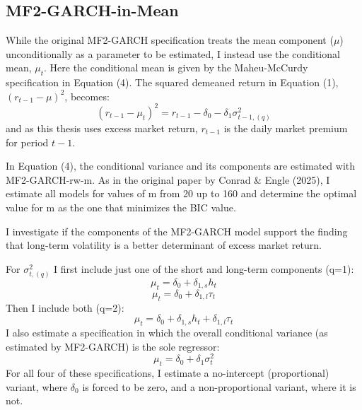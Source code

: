 \documentclass[12pt]{article}
\begin{document}
\subsection{MF2-GARCH-in-Mean}
While the original MF2-GARCH specification treats the mean component ($\mu$) unconditionally as a parameter to be estimated, I instead use the conditional mean, $\mu_t$. Here the conditional mean is given by the Maheu-McCurdy specification in Equation (4). The squared demeaned return in Equation (1), $(r_{t-1}-\mu)^2$, becomes:
\begin{equation}
\nonumber
(r_{t-1}-\mu_t)^2=r_{t-1}-\delta_0-\delta_1\sigma_{t-1,(q)}^2
\end{equation}
and as this thesis uses excess market return, $r_{t-1}$ is the daily market premium for period $t-1$.\par
In Equation (4), the conditional variance and its components are estimated with MF2-GARCH-rw-m. As in the original paper by Conrad \& Engle (2025), I estimate all models for values of m from 20 up to 160 and determine the optimal value for m as the one that minimizes the BIC value.\par
I investigate if the components of the MF2-GARCH model support the finding that long-term volatility is a better determinant of excess market return.\par
\noindent For $\sigma_{t,(q)}^2$ I first include just one of the short and long-term components (q=1):
\begin{equation}
\nonumber
\mu_t=\delta_0+\delta_{1,s}h_t
\end{equation}
\begin{equation}
\nonumber
\mu_t=\delta_0+\delta_{1,l}\tau_t
\end{equation}
Then I include both (q=2):
\begin{equation}
\nonumber
\mu_t=\delta_0+\delta_{1,s}h_t+\delta_{1,l}\tau_t
\end{equation}
I also estimate a specification in which the overall conditional variance (as estimated by MF2-GARCH) is the sole regressor:
\begin{equation}
\nonumber
\mu_t=\delta_0+\delta_1\sigma_t^2
\end{equation}
For all four of these specifications, I estimate a no-intercept (proportional) variant, where $\delta_0$ is forced to be zero, and a non-proportional variant, where it is not.
\end{document}
